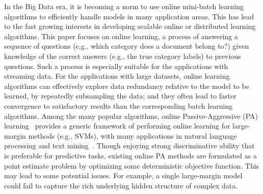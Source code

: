 \documentclass[twoside,11pt]{article}
\begin{document}

In the Big Data era, it is becoming a norm to use online mini-batch learning algorithms to efficiently handle models in many application areas. This has lead to the fast growing interests in developing scalable online or distributed learning algorithms. This paper focuses on online learning, a process of answering a sequence of questions (e.g., which category does a document belong to?) given knowledge of the correct answers (e.g., the true category labels) to previous questions. Such a process is especially suitable for the applications with streaming data. For the applications with large datasets, online learning algorithms can effectively explore data redundancy relative to the model to be learned, by repeatedly subsampling the data; and they often lead to faster convergence to satisfactory results than the corresponding batch learning  algorithms. Among the many popular algorithms, online Passive-Aggressive (PA) learning~\citep{crammer2006pa} provides a generic framework of performing online learning for large-margin methods (e.g., SVMs), with many applications in natural language processing and text mining~\citep{McDonald2005parsing, chiang2008emnlp}. Though enjoying strong discriminative ability that is preferable for predictive tasks, existing online PA methods are formulated as a point estimate problem by optimizing some deterministic objective function. This may lead to some potential issues. For example, a single large-margin model could fail to capture the rich underlying hidden structure of complex data. %
\end{document}
